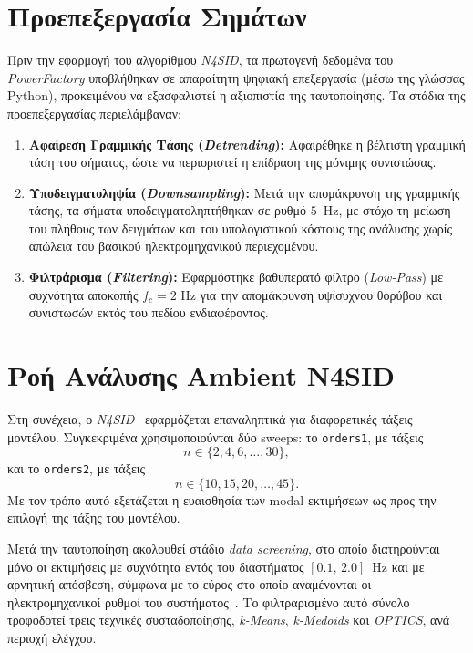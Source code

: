\documentclass[a4paper,12pt,twoside,openright]{report}
\begin{document}
\section{Προεπεξεργασία Σημάτων}
Πριν την εφαρμογή του αλγορίθμου \textit{N4SID}, τα πρωτογενή δεδομένα του \textit{PowerFactory} υποβλήθηκαν σε απαραίτητη ψηφιακή επεξεργασία (μέσω της γλώσσας Python), προκειμένου να εξασφαλιστεί η αξιοπιστία της ταυτοποίησης. Τα στάδια της προεπεξεργασίας περιελάμβαναν:

\begin{enumerate}
    \item \textbf{Αφαίρεση Γραμμικής Τάσης (\textit{Detrending}):} Αφαιρέθηκε η βέλτιστη γραμμική τάση του σήματος, ώστε να περιοριστεί η επίδραση της μόνιμης συνιστώσας. 
    \item \textbf{Υποδειγματοληψία (\textit{Downsampling}):} Μετά την απομάκρυνση της γραμμικής τάσης, τα σήματα υποδειγματοληπτήθηκαν σε ρυθμό $5$~Hz, με στόχο τη μείωση του πλήθους των δειγμάτων και του υπολογιστικού κόστους της ανάλυσης χωρίς απώλεια του βασικού ηλεκτρομηχανικού περιεχομένου.
    \item \textbf{Φιλτράρισμα (\textit{Filtering}):} Εφαρμόστηκε βαθυπερατό φίλτρο (\textit{Low-Pass}) με συχνότητα αποκοπής $f_{c} = 2$ Hz για την απομάκρυνση υψίσυχνου θορύβου και συνιστωσών εκτός του πεδίου ενδιαφέροντος.
\end{enumerate}

\section{Ροή Ανάλυσης Ambient N4SID}
  Στη συνέχεια, ο \textit{N4SID}~\cite{n4sid1994} εφαρμόζεται επαναληπτικά για διαφορετικές τάξεις μοντέλου. Συγκεκριμένα χρησιμοποιούνται δύο sweeps: το \texttt{orders1}, με τάξεις
  \[
  n \in \{2,4,6,\dots,30\},
  \]
  και το \texttt{orders2}, με τάξεις
  \[
  n \in \{10,15,20,\dots,45\}.
  \]
  Με τον τρόπο αυτό εξετάζεται η ευαισθησία των modal εκτιμήσεων ως προς την επιλογή της τάξης του μοντέλου.

  Μετά την ταυτοποίηση ακολουθεί στάδιο \textit{data screening}, στο οποίο διατηρούνται μόνο οι εκτιμήσεις με συχνότητα εντός του διαστήματος $[0.1,\,2.0]$~Hz και με αρνητική απόσβεση, σύμφωνα με το εύρος στο οποίο αναμένονται οι ηλεκτρομηχανικοί ρυθμοί του συστήματος~\cite{sarkar2024drga}. Το φιλτραρισμένο αυτό σύνολο τροφοδοτεί τρεις τεχνικές συσταδοποίησης, \textit{k-Means}, \textit{k-Medoids} και \textit{OPTICS}, ανά περιοχή ελέγχου.
\end{document}

